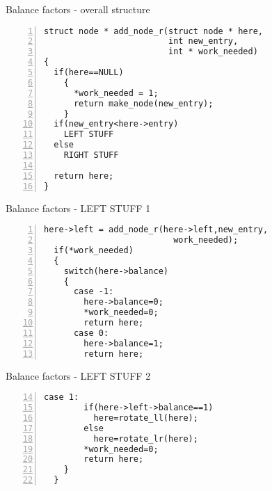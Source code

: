 \documentclass{beamer}
\begin{document}
\begin{frame}[fragile]{Balance factors - overall structure}
\begin{lstlisting}[numbers=left]
struct node * add_node_r(struct node * here,
                         int new_entry,
                         int * work_needed)
{
  if(here==NULL)
    {
      *work_needed = 1;
      return make_node(new_entry);
    }
  if(new_entry<here->entry)
    LEFT STUFF  
  else
    RIGHT STUFF
 
  return here;
}
\end{lstlisting}
\end{frame}
\begin{frame}[fragile]{Balance factors - LEFT STUFF 1}
\begin{lstlisting}[numbers=left]
  here->left = add_node_r(here->left,new_entry,
                          work_needed);
  if(*work_needed)
  {
    switch(here->balance)
    {
      case -1:
        here->balance=0;
        *work_needed=0;
        return here;
      case 0:
        here->balance=1;
        return here;
\end{lstlisting}
\end{frame}
\begin{frame}[fragile]{Balance factors - LEFT STUFF 2}
\begin{lstlisting}[numbers=left, firstnumber=14]
      case 1:
        if(here->left->balance==1)
          here=rotate_ll(here);
        else
          here=rotate_lr(here);
        *work_needed=0;
        return here;
    }
  }
\end{lstlisting}
\end{frame}
\end{document}
